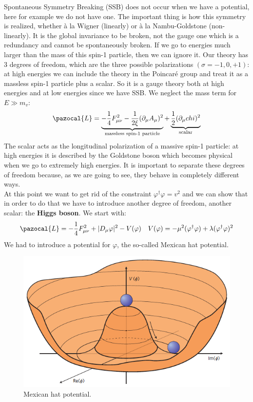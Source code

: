 \documentclass[../main.tex]{subfiles}
\begin{document}
Spontaneous Symmetry Breaking (SSB) does not occur when we have a potential, here for example we do not have one. The important thing is how this symmetry is realized, whether à la Wigner (linearly) or à la Nambu-Goldstone (non-linearly). It is the global invariance to be broken, not the gauge one which is a redundancy and cannot be spontaneously broken. If we go to energies much larger than the mass of this spin-1 particle, then we can ignore it. Our theory has 3 degrees of freedom, which are the three possible polarizations $(\sigma=-1,0,+1)$: at high energies we can include the theory in the Poincaré group and treat it as a massless spin-1 particle plus a scalar. So it is a gauge theory both at high energies and at low energies since we have SSB. We neglect the mass term for $E\gg m_v$:
\[
\pazocal{L}=\underbrace{-\frac{1}{4}F_{\mu\nu}^2-\frac{1}{2\xi}(\partial_\mu A_\mu)^2}_{\text{massless spin-1 particle}}+\underbrace{\frac{1}{2}(\partial_\mu chi)^2}_{\text{scalar}}
\]
The scalar acts as the longitudinal polarization of a massive spin-1 particle: at high energies it is described by the Goldstone boson which becomes physical when we go to extremely high energies. It is important to separate these degrees of freedom because, as we are going to see, they behave in completely different ways.\\
At this point we want to get rid of the constraint $\varphi^\dagger\varphi=v^2$ and we can show that in order to do that we have to introduce another degree of freedom, another scalar: the \textbf{Higgs boson}. We start with:
\[
\pazocal{L}=-\frac{1}{4}F_{\mu\nu}^2+|D_\mu\varphi|^2-V(\varphi) \quad V(\varphi)=-\mu^2(\varphi^\dagger\varphi)+\lambda(\varphi^\dagger\varphi)^2
\]
We had to introduce a potential for $\varphi$, the so-called Mexican hat potential.
\begin{figure}[h]
    \centering
    \includegraphics{Images/higgspotential.png}
    \caption{Mexican hat potential.}
    \label{fig:my_label}
\end{figure}\\
\end{document}
